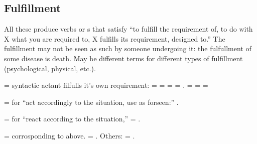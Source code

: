 \subsection{Fulfillment}
All these produce verbs or s that satisfy ``to fulfill the
requirement of, to do with X what you are required to, X fulfills its
requirement, designed to.'' The fulfillment may not be seen as such by
someone undergoing it: the fulfullment of some disease is death.  May
be different terms for different types of fulfillment (psychological,
physical, etc.).

\begin{multicols}{2}
 = syntactic actant  filfulls it's own requirement:
 = 
 = 
 = 
 = .
 = 
 = 
 = 

 =  for ``act accordingly to the situation, use as
forseen:'' . 

 =  for ``react according to the situation,''
 = . 

 =  corrosponding to  above.
 = .  Others: 
 = .
\end{multicols}


